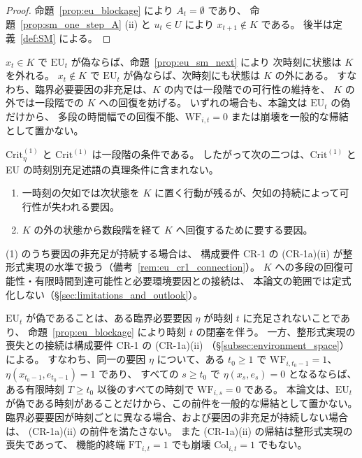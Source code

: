 \begin{proof}
命題~\ref{prop:eu_blockage} により $A_t=\emptyset$ であり、
命題~\ref{prop:sm_one_step_A} (ii) と $u_t\in U$ により $x_{t+1}\notin K$ である。
後半は定義~\ref{def:SM} による。
\end{proof}

\begin{remark}[維持の局面と回復の局面]
\label{rem:eu_maintenance_recovery}
$x_t\in K$ で $\mathrm{EU}_t$ が偽ならば、命題~\ref{prop:eu_sm_next} により
次時刻に状態は $K$ を外れる。
$x_t\notin K$ で $\mathrm{EU}_t$ が偽ならば、次時刻にも状態は $K$ の外にある。
すなわち、臨界必要要因の非充足は、$K$ の内では一段階での可行性の維持を、
$K$ の外では一段階での $K$ への回復を妨げる。
いずれの場合も、本論文は $\mathrm{EU}_t$ の偽だけから、
多段の時間幅での回復不能、$\mathrm{WF}_{i,t}=0$ または崩壊を一般的な帰結として置かない。
\end{remark}

\begin{remark}[一段階の必要性の射程]
\label{rem:eu_one_step_scope}
$\mathrm{Crit}^{(1)}_\eta$ と $\mathrm{Crit}^{(1)}$ は一段階の条件である。
したがって次の二つは、$\mathrm{Crit}^{(1)}$ と EU の時刻別充足述語の真理条件に含まれない。
\begin{enumerate}
  \item 一時刻の欠如では次状態を $K$ に置く行動が残るが、欠如の持続によって可行性が失われる要因。
  \item $K$ の外の状態から数段階を経て $K$ へ回復するために要する要因。
\end{enumerate}
(1) のうち要因の非充足が持続する場合は、
構成要件 CR-1 の (CR-1a)(ii) が整形式実現の水準で扱う（備考~\ref{rem:eu_cr1_connection}）。
$K$ への多段の回復可能性・有限時間到達可能性と必要環境要因との接続は、
本論文の範囲では定式化しない（\S\ref{sec:limitations_and_outlook}）。
\end{remark}

\begin{remark}
\label{rem:eu_cr1_connection}
$\mathrm{EU}_t$ が偽であることは、ある臨界必要要因 $\eta$ が時刻 $t$ に充足されないことであり、
命題~\ref{prop:eu_blockage} により時刻 $t$ の閉塞を伴う。
一方、整形式実現の喪失との接続は構成要件 CR-1 の (CR-1a)(ii)
（\S\ref{subsec:environment_space}）による。
すなわち、同一の要因 $\eta$ について、ある $t_0\ge1$ で
$\mathrm{WF}_{i,t_0-1}=1$、$\eta(x_{t_0-1},e_{t_0-1})=1$ であり、
すべての $s\ge t_0$ で $\eta(x_s,e_s)=0$ となるならば、
ある有限時刻 $T\ge t_0$ 以後のすべての時刻で $\mathrm{WF}_{i,s}=0$ である。
本論文は、$\mathrm{EU}_t$ が偽である時刻があることだけから、この前件を一般的な帰結として置かない。
臨界必要要因が時刻ごとに異なる場合、および要因の非充足が持続しない場合は、
(CR-1a)(ii) の前件を満たさない。
また (CR-1a)(ii) の帰結は整形式実現の喪失であって、
機能的終端 $\mathrm{FT}_{i,t}=1$ でも崩壊 $\mathrm{Col}_{i,t}=1$ でもない。
\end{remark}

